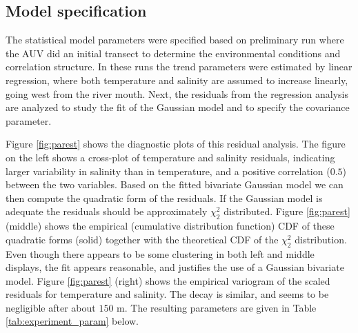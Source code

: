 \documentclass[aoas]{imsart}
\begin{document}
\subsection{Model specification}

The statistical model parameters were specified based on preliminary
run where the AUV did an initial transect to determine the
environmental conditions and correlation structure. In these runs the
trend parameters were estimated by linear regression, where both
temperature and salinity are assumed to increase linearly, going west
from the river mouth. Next, the residuals from the regression analysis
are analyzed to study the fit of the Gaussian model and to specify the
covariance parameter.

Figure \ref{fig:parest} shows the diagnostic plots of this residual
analysis. The figure on the left shows a cross-plot of temperature and
salinity residuals, indicating larger variability in salinity than in
temperature, and a positive correlation ($0.5$) between the two
variables. Based on the fitted bivariate Gaussian model we can then
compute the quadratic form of the residuals. If the Gaussian model is
adequate the residuals should be approximately $\chi^2_2$
distributed. Figure \ref{fig:parest} (middle) shows the empirical
(cumulative distribution function) CDF of these quadratic forms
(solid) together with the theoretical CDF of the $\chi^2_2$
distribution. Even though there appears to be some clustering in both
left and middle displays, the fit appears reasonable, and justifies
the use of a Gaussian bivariate model. Figure \ref{fig:parest} (right)
shows the empirical variogram of the scaled residuals for temperature
and salinity. The decay is similar, and seems to be negligible after
about $150$ m. The resulting parameters are given in Table
\ref{tab:experiment_param} below.


\end{document}
